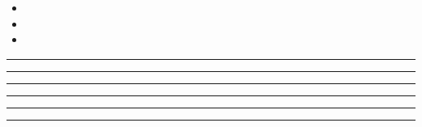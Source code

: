 \documentclass[11pt,a4paper]{article}
\begin{document}
\swarmwrapnext
\begin{itemize}
  \item \lipsum[1][1-3]
  \item \lipsum[2][1-3]
  \item \lipsum[3][1-3]
\end{itemize}
\begin{swarmwrap}%
  \begin{minipage}[t]{5cm}
    \centering
    \textcolor{red!20}{\rule{\linewidth}{8cm}}
  \end{minipage}%
\end{swarmwrap}%
\swarmwrapnext\lipsum[1]\lipsum[2]\lipsum[3]\lipsum[4]
\begin{swarmwrap}%
  \begin{minipage}[t]{2cm}
    \centering
    \textcolor{red!20}{\rule{\linewidth}{9cm}}
  \end{minipage}%
\end{swarmwrap}%
\swarmwrapnext\lipsum[1]\lipsum[2]\lipsum[3]\lipsum[4]\lipsum[5]
\begin{swarmwrap}%
  \begin{minipage}[t]{3cm}
    \centering
    \textcolor{red!20}{\rule{\linewidth}{10cm}}
  \end{minipage}%
\end{swarmwrap}%
\swarmwrapnext\lipsum[1]\lipsum[2]\lipsum[3]\lipsum[4]\lipsum[5]\lipsum[6]
\begin{swarmwrap}%
  \begin{minipage}[t]{4cm}
    \centering
    \textcolor{red!20}{\rule{\linewidth}{2cm}}
  \end{minipage}%
\end{swarmwrap}%
\swarmwrapnext\lipsum[1]
\begin{swarmwrap}%
  \begin{minipage}[t]{5cm}
    \centering
    \textcolor{red!20}{\rule{\linewidth}{3cm}}
  \end{minipage}%
\end{swarmwrap}%
\swarmwrapnext\lipsum[1]\lipsum[2]
\begin{swarmwrap}%
  \begin{minipage}[t]{2cm}
    \centering
    \textcolor{red!20}{\rule{\linewidth}{4cm}}
  \end{minipage}%
\end{swarmwrap}%
\end{document}
